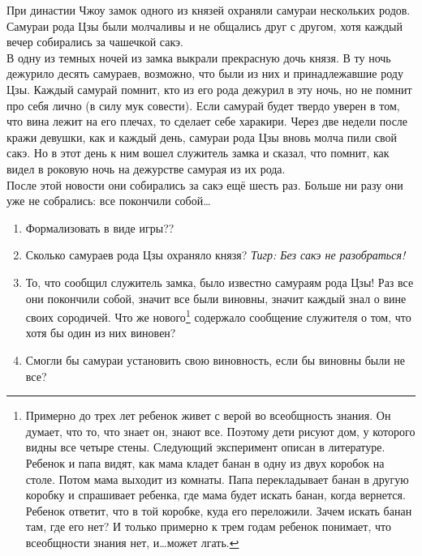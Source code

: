 \begin{problem}
При династии Чжоу замок одного из князей охраняли самураи нескольких родов. Самураи рода Цзы были молчаливы и не общались друг с другом, хотя каждый вечер собирались за чашечкой сакэ.\\
В одну из темных ночей из замка выкрали прекрасную дочь князя. В ту ночь дежурило десять самураев, возможно, что были из них и принадлежавшие роду Цзы. Каждый самурай помнит, кто из его рода дежурил в эту ночь, но не помнит про себя лично (в силу мук совести). Если самурай будет твердо уверен в том, что вина лежит на его плечах, то сделает себе харакири.
Через две недели после кражи девушки, как и каждый день, самураи рода Цзы вновь молча пили свой сакэ. Но в этот день к ним вошел служитель замка и сказал, что помнит, как видел в роковую ночь на дежурстве самурая из их рода.\\
После этой новости они собирались за сакэ ещё шесть раз. Больше ни разу они уже не собрались: все покончили собой\ldots \\
\begin{enumerate}
\item {\red Формализовать в виде игры??}
\item Сколько самураев рода Цзы охраняло князя? {\it Тигр: Без сакэ не разобраться!}
\item То, что сообщил служитель замка, было известно  самураям рода Цзы! Раз все они покончили собой, значит все были виновны, значит каждый знал о вине своих сородичей. Что же нового\footnote{ Примерно до трех лет ребенок живет с верой во всеобщность знания. Он думает, что то, что знает он, знают все. Поэтому дети рисуют дом, у которого видны все четыре стены. Следующий эксперимент описан в литературе. Ребенок и папа видят, как мама кладет банан в одну из двух коробок на столе. Потом мама выходит из комнаты. Папа перекладывает банан в другую коробку и спрашивает ребенка, где мама будет искать банан, когда вернется. Ребенок ответит, что в той коробке, куда его переложили. Зачем искать банан там, где его нет? И только примерно к трем годам ребенок понимает, что всеобщности знания нет, и\ldots может лгать.} содержало сообщение служителя о том, что хотя бы один из них виновен?
\item  Смогли бы самураи установить свою виновность, если бы виновны были не все?
\end{enumerate}


\begin{sol}

\end{sol}
\end{problem}




